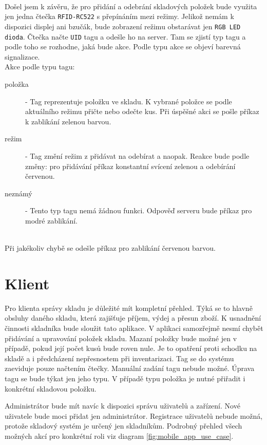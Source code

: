 \documentclass[czech,BP]{thesiskiv}
\begin{document}
				\ \\
				Došel jsem k závěru, že pro přidání a odebrání skladových položek bude využita jen jedna čtečka \texttt{RFID-RC522} s přepínáním mezi režimy.
				Jelikož nemám k dispozici displej ani bzučák, bude zobrazení režimu obstarávat jen \texttt{RGB LED dioda}. Čtečka načte \texttt{UID} tagu a odešle ho na server. Tam se zjistí typ tagu a podle toho se rozhodne, jaká bude akce. Podle typu akce se objeví barevná signalizace. 
				\ \\
				Akce podle typu tagu:
				\begin{description}
					\item [položka] - Tag reprezentuje položku ve skladu. K vybrané položce se podle aktuálního režimu přičte nebo odečte kus. Při úspěšné akci se pošle příkaz k zablikání zelenou barvou.
									
					\item [režim] - Tag změní režim z přidávat na odebírat a naopak. Reakce bude podle změny: pro přidávání příkaz konstantní svícení zelenou a odebírání červenou.
					\item [neznámý] - Tento typ tagu nemá žádnou funkci. Odpověď serveru bude příkaz pro modré zablikání.
				\end{description}
				\ \\
				Při jakékoliv chybě se odešle příkaz pro zablikání červenou barvou.

				
	\section{Klient}
		Pro klienta správy skladu je důležité mít kompletní přehled. Týká se to hlavně obsluhy daného skladu, která zajišťuje příjem, výdej a přesun zboží.
		K usnadnění činnosti skladníka bude sloužit tato aplikace. V aplikaci samozřejmě nesmí chybět přidávání a upravování položek skladu.
		Mazaní položky bude možné jen v případě, pokud její počet kusů bude roven nule. Je to opatření proti schodku na skladě a i předcházení nepřesnostem při inventarizaci.
		Tag se do systému zaeviduje pouze načtením čtečky. Manuální zadání tagu nebude možné. Úprava tagu se bude týkat jen jeho typu. V případě typu položka je nutné přiřadit i konkrétní skladovou položku.
		
		Administrátor bude mít navíc k dispozici správu uživatelů a zařízení.
		Nové uživatele bude moci přidat jen administrátor. Registrace uživatelů nebude možná, protože skladový systém je určený jen skladníkům.
		Podrobný přehled všech možných akcí pro konkrétní roli viz diagram \ref{fig:mobile_app_use_case}. 
		
\end{document}
